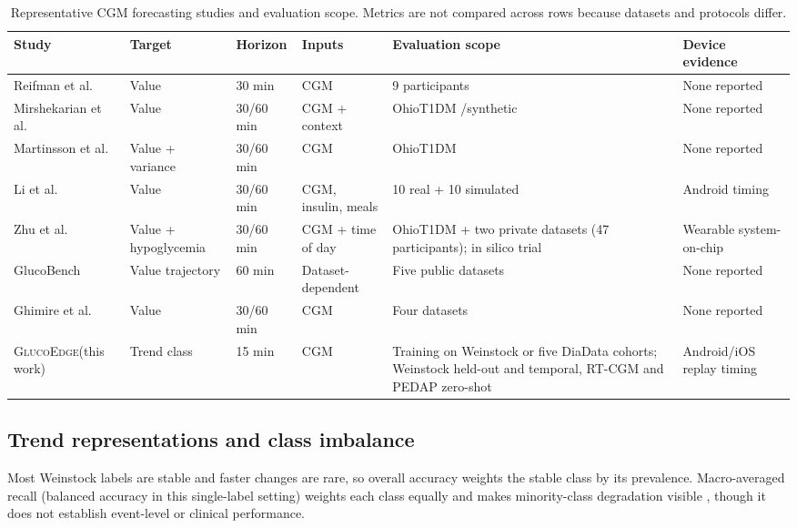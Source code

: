 \documentclass[10pt,twocolumn]{article}
\newcommand{\project}{\textsc{GlucoEdge}\xspace}
\begin{document}
\begin{table}[t]
\centering
\caption{Representative CGM forecasting studies and evaluation scope. Metrics
are not compared across rows because datasets and protocols differ.}
\label{tab:relatedwork}
\small\setlength{\tabcolsep}{4pt}
\begin{tabular}{@{}lp{1.9cm}lp{2.3cm}p{4.6cm}p{2.3cm}@{}}
\toprule
Study & Target & Horizon & Inputs & Evaluation scope & Device evidence \\
\midrule
Reifman et al. \cite{reifman2007predictive} & Value & 30 min & CGM & 9 participants & None reported \\
Mirshekarian et al. \cite{mirshekarian2019lstm} & Value & 30/60 min & CGM + context & OhioT1DM \cite{marling2020ohiot1dm}/synthetic & None reported \\
Martinsson et al. \cite{martinsson2020variance} & \raggedright Value + variance & 30/60 min & CGM & OhioT1DM \cite{marling2020ohiot1dm} & None reported \\
Li et al. \cite{li2020crnn} & Value & 30/60 min & \raggedright CGM, insulin, meals & 10 real + 10 simulated & Android timing \\
Zhu et al. \cite{zhu2023iomt} & \raggedright Value + hypoglycemia & 30/60 min & \raggedright CGM + time of day & \raggedright OhioT1DM \cite{marling2020ohiot1dm} + two private datasets (47 participants); in silico trial & \raggedright Wearable system-on-chip \tabularnewline
GlucoBench \cite{sergazinov2024glucobench} & \raggedright Value trajectory & 60 min & \raggedright Dataset-dependent & Five public datasets & None reported \\
Ghimire et al. \cite{ghimire2024generalize} & Value & 30/60 min & CGM & Four datasets & None reported \\
\project (this work) & Trend class & 15 min & CGM & \raggedright Training on Weinstock or five DiaData cohorts; Weinstock held-out and temporal, RT-CGM and PEDAP zero-shot & \raggedright Android/iOS replay timing \tabularnewline
\bottomrule
\end{tabular}
\end{table}

\subsection{Trend representations and class imbalance}

Most Weinstock labels are stable and faster changes are rare, so overall
accuracy weights the stable class by its prevalence. Macro-averaged recall
(balanced accuracy in this single-label setting) weights each class equally
and makes minority-class degradation visible \cite{brodersen2010balanced},
though it does not establish event-level or clinical performance.
\end{document}
